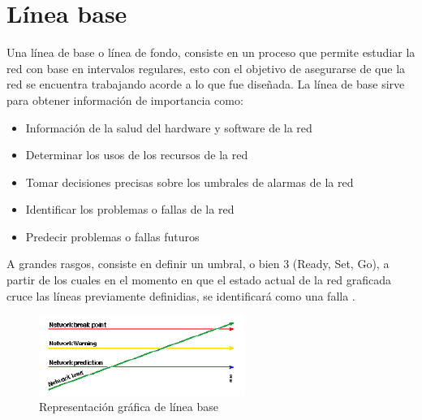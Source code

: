 \section{Línea base}
Una línea de base o línea de fondo, consiste en un proceso que permite estudiar la red con base en intervalos regulares, esto con el objetivo de asegurarse de que la red se encuentra trabajando acorde a lo que fue diseñada.
\newline
La línea de base sirve para obtener información de importancia como:
\begin{itemize}
    \item Información de la salud del hardware y software de la red
    \item Determinar los usos de los recursos de la red
    \item Tomar decisiones precisas sobre los umbrales de alarmas de la red
    \item Identificar los problemas o fallas de la red
    \item Predecir problemas o fallas futuros
\end{itemize}
A grandes rasgos, consiste en definir un umbral, o bien 3 (Ready, Set, Go), a partir de los cuales en el momento en que el estado actual de la red graficada cruce las líneas previamente definidias, se identificará como una falla \cite{LineaBase}.
\begin{figure}[H]
\vspace{1cm}
\centering
\includegraphics[width=0.6\textwidth]{imagenes/lineaBase.PNG}
\caption{Representación gráfica de línea base}
\end{figure}

